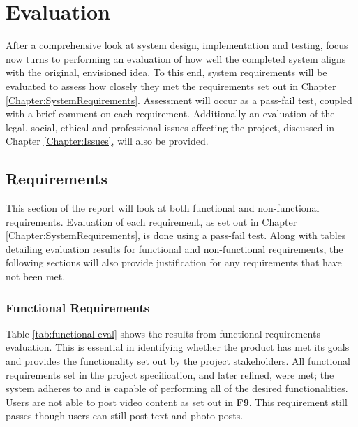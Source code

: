 \chapter{Evaluation}
\label{Chapter:Evaluation}
After a comprehensive look at system design, implementation and testing, focus now turns to performing an evaluation of how well the completed system aligns with the original, envisioned idea. To this end, system requirements will be evaluated to assess how closely they met the requirements set out in Chapter \ref{Chapter:SystemRequirements}. Assessment will occur as a pass-fail test, coupled with a brief comment on each requirement. Additionally an evaluation of the legal, social, ethical and professional issues affecting the project, discussed in Chapter \ref{Chapter:Issues}, will also be provided.

\section{Requirements}
This section of the report will look at both functional and non-functional requirements. Evaluation of each requirement, as set out in Chapter  \ref{Chapter:SystemRequirements}, is done using a pass-fail test. Along with tables detailing evaluation results for functional and non-functional requirements, the following sections will also provide justification for any requirements that have not been met.

\subsection{Functional Requirements}
Table \ref{tab:functional-eval} shows the results from functional requirements evaluation. This is essential in identifying whether the product has met its goals and provides the functionality set out by the project stakeholders. All functional requirements set in the project specification, and later refined, were met; the system adheres to and is capable of performing all of the desired functionalities. Users are not able to post video content as set out in \textbf{F9}. This requirement still passes though users can still post text and photo posts. 

